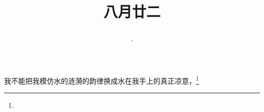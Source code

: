 \title{\date[d=24,m=9,y=2024][year:cn-y,年,month:cn,day:cn,日,·,weekday]·八月廿二 }
我不能把我模仿水的涟漪的韵律换成水在我手上的真正凉意，\footnote{ }

